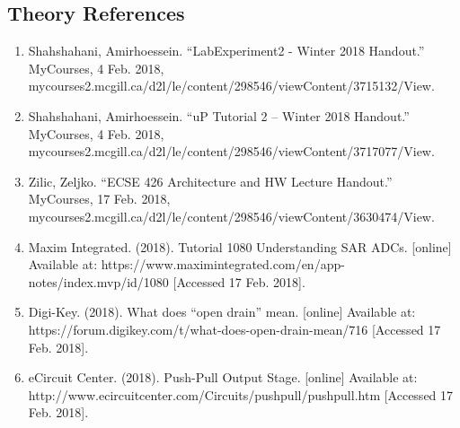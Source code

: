 \documentclass[12pt]{report}
\begin{document}
\begin{appendix}
	\newpage
	\chapter{Theory References}
	\begin{enumerate}
		\item Shahshahani, Amirhoessein. “LabExperiment2 - Winter 2018 Handout.” MyCourses, 4 Feb. 2018, mycourses2.mcgill.ca/d2l/le/content/298546/viewContent/3715132/View.
		\item Shahshahani, Amirhoessein. “uP Tutorial 2 – Winter 2018 Handout.” MyCourses, 4 Feb. 2018, mycourses2.mcgill.ca/d2l/le/content/298546/viewContent/3717077/View.
		\item Zilic, Zeljko. “ECSE 426 Architecture and HW Lecture Handout.” MyCourses, 17 Feb. 2018, mycourses2.mcgill.ca/d2l/le/content/298546/viewContent/3630474/View.
		\item Maxim Integrated. (2018). Tutorial 1080 Understanding SAR ADCs. [online] Available at: 
https://www.maximintegrated.com/en/app-notes/index.mvp/id/1080 [Accessed 17 Feb. 2018].
		\item Digi-Key. (2018). What does “open drain” mean. [online] Available at:\\
https://forum.digikey.com/t/what-does-open-drain-mean/716 [Accessed 17 Feb. 2018].
		\item eCircuit Center. (2018). Push-Pull Output Stage. [online] Available at:\\
http://www.ecircuitcenter.com/Circuits/pushpull/pushpull.htm [Accessed 17 Feb. 2018].
	\end{enumerate}
\end{appendix}
\end{document}
